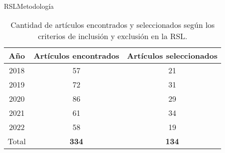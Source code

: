 \documentclass[10pt]{beamer}
\newcommand{\1}{
	\setbeamertemplate{background}{
		\texttt{[image: img/1]}
		\tikz[overlay] \fill[fill opacity=0.75,fill=white] (0,0) rectangle (-\paperwidth,\paperheight);
	}
}
\begin{document}
\begin{frame}{RSL}{Metodología}
	
	\begin{table}[H]
		\begin{center}
			\caption{Cantidad de artículos encontrados y seleccionados según los criterios de inclusión y exclusión en la RSL.}
			\label{tab:number_papers}
			\setlength{\tabcolsep}{0.5em} %
			{\renewcommand{\arraystretch}{1.2}%
				\begin{tabular}{ccc}
					\textbf{Año} & \textbf{Artículos encontrados} & \textbf{Artículos seleccionados}\\ \hline
					2018 & 57 & 21 \\
					2019 & 72 & 31 \\
					2020 & 86 & 29 \\
					2021 & 61 & 34 \\
					2022 & 58 & 19 \\ \hline
					Total & \textbf{334} & \textbf{134} \\
				\end{tabular}
			}
		\end{center}
	\end{table}
	
\end{frame}

\end{document}
